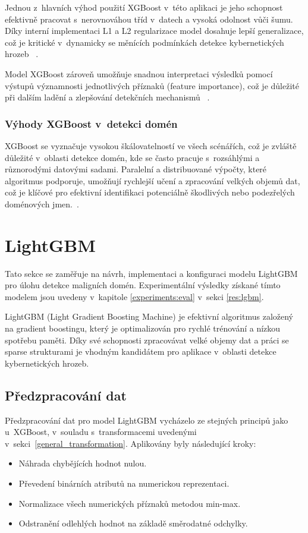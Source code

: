 Jednou z~hlavních výhod použití XGBoost v~této aplikaci je jeho schopnost efektivně pracovat s~nerovnováhou tříd v~datech a vysoká odolnost vůči šumu. Díky interní implementaci L1 a L2 regularizace model dosahuje lepší generalizace, což je kritické v~dynamicky se měnících podmínkách detekce kybernetických hrozeb ~\cite{chen2016xgboost}.

Model XGBoost zároveň umožňuje snadnou interpretaci výsledků pomocí výstupů významnosti jednotlivých příznaků (feature importance), což je důležité při dalším ladění a zlepšování detekčních mechanismů ~\cite{lundberg2017unified}.

\subsubsection{Výhody XGBoost v~detekci domén}
XGBoost se vyznačuje vysokou škálovatelností ve všech scénářích, což je zvláště důležité v~oblasti detekce domén, kde se často pracuje s~rozsáhlými a různorodými datovými sadami. Paralelní a distribuované výpočty, které algoritmus podporuje, umožňují rychlejší učení a zpracování velkých objemů dat, což je klíčové pro efektivní identifikaci potenciálně škodlivých nebo podezřelých doménových jmen.~\cite{chen2016xgboost}.





\section{LightGBM}

Tato sekce se zaměřuje na návrh, implementaci a konfiguraci modelu LightGBM pro úlohu detekce maligních domén. Experimentální výsledky získané tímto modelem jsou uvedeny v~kapitole \ref{experiments:eval} v~sekci \ref{res:lgbm}.

LightGBM (Light Gradient Boosting Machine) je efektivní algoritmus založený na gradient boostingu, který je optimalizován pro rychlé trénování a nízkou spotřebu paměti. Díky své schopnosti zpracovávat velké objemy dat a práci se sparse strukturami je vhodným kandidátem pro aplikace v~oblasti detekce kybernetických hrozeb. \cite{ke2017lightgbm}


\subsection{Předzpracování dat}

Předzpracování dat pro model LightGBM vycházelo ze stejných principů jako u~XGBoost, v~souladu s~transformacemi uvedenými v~sekci~\ref{general_transformation}. Aplikovány byly následující kroky:
\begin{itemize}
    \item Náhrada chybějících hodnot nulou.
    \item Převedení binárních atributů na numerickou reprezentaci.
    \item Normalizace všech numerických příznaků metodou min-max.
    \item Odstranění odlehlých hodnot na základě směrodatné odchylky.
\end{itemize}

